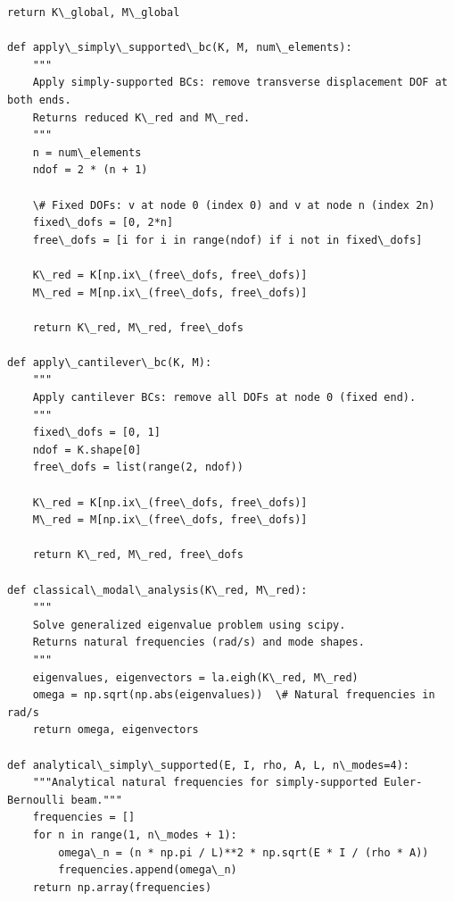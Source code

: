 \documentclass[12pt, a4paper]{article}
\begin{document}
\begin{lstlisting}[style=codestyle, caption={{fea.py --- Beam Finite Element Analysis}}]
    return K\_global, M\_global

def apply\_simply\_supported\_bc(K, M, num\_elements):
    """
    Apply simply-supported BCs: remove transverse displacement DOF at both ends.
    Returns reduced K\_red and M\_red.
    """
    n = num\_elements
    ndof = 2 * (n + 1)
    
    \# Fixed DOFs: v at node 0 (index 0) and v at node n (index 2n)
    fixed\_dofs = [0, 2*n]
    free\_dofs = [i for i in range(ndof) if i not in fixed\_dofs]
    
    K\_red = K[np.ix\_(free\_dofs, free\_dofs)]
    M\_red = M[np.ix\_(free\_dofs, free\_dofs)]
    
    return K\_red, M\_red, free\_dofs

def apply\_cantilever\_bc(K, M):
    """
    Apply cantilever BCs: remove all DOFs at node 0 (fixed end).
    """
    fixed\_dofs = [0, 1]
    ndof = K.shape[0]
    free\_dofs = list(range(2, ndof))
    
    K\_red = K[np.ix\_(free\_dofs, free\_dofs)]
    M\_red = M[np.ix\_(free\_dofs, free\_dofs)]
    
    return K\_red, M\_red, free\_dofs

def classical\_modal\_analysis(K\_red, M\_red):
    """
    Solve generalized eigenvalue problem using scipy.
    Returns natural frequencies (rad/s) and mode shapes.
    """
    eigenvalues, eigenvectors = la.eigh(K\_red, M\_red)
    omega = np.sqrt(np.abs(eigenvalues))  \# Natural frequencies in rad/s
    return omega, eigenvectors

def analytical\_simply\_supported(E, I, rho, A, L, n\_modes=4):
    """Analytical natural frequencies for simply-supported Euler-Bernoulli beam."""
    frequencies = []
    for n in range(1, n\_modes + 1):
        omega\_n = (n * np.pi / L)**2 * np.sqrt(E * I / (rho * A))
        frequencies.append(omega\_n)
    return np.array(frequencies)
\end{lstlisting}

\end{document}
